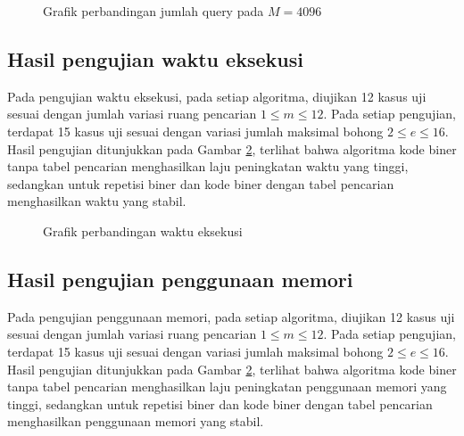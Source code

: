 \begin{figure}
\centering
{}
\caption{Grafik perbandingan jumlah query pada $M=4096$}
\label{fig:graph_query12}
\end{figure}

\subsection{Hasil pengujian waktu eksekusi}

Pada pengujian waktu eksekusi, pada setiap algoritma, diujikan 12 kasus uji sesuai dengan jumlah variasi ruang pencarian $1 \leq m \leq 12$. Pada setiap pengujian, terdapat 15 kasus uji sesuai dengan variasi jumlah maksimal bohong $2 \leq e \leq 16$. Hasil pengujian ditunjukkan pada Gambar \ref{fig:graph_time}, terlihat bahwa algoritma kode biner tanpa tabel pencarian menghasilkan laju peningkatan waktu yang tinggi, sedangkan untuk repetisi biner dan kode biner dengan tabel pencarian menghasilkan waktu yang stabil.

\begin{figure}
\centering
{}
\caption{Grafik perbandingan waktu eksekusi}
\label{fig:graph_time}
\end{figure}

\subsection{Hasil pengujian penggunaan memori}

Pada pengujian penggunaan memori, pada setiap algoritma, diujikan 12 kasus uji sesuai dengan jumlah variasi ruang pencarian $1 \leq m \leq 12$. Pada setiap pengujian, terdapat 15 kasus uji sesuai dengan variasi jumlah maksimal bohong $2 \leq e \leq 16$. Hasil pengujian ditunjukkan pada Gambar \ref{fig:graph_time}, terlihat bahwa algoritma kode biner tanpa tabel pencarian menghasilkan laju peningkatan penggunaan memori yang tinggi, sedangkan untuk repetisi biner dan kode biner dengan tabel pencarian menghasilkan penggunaan memori yang stabil.

